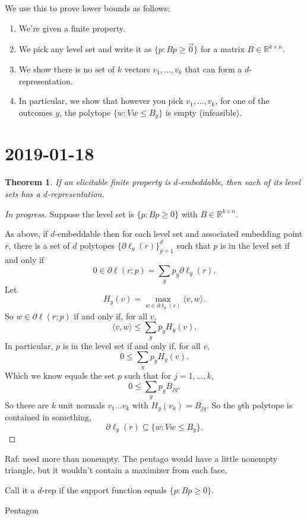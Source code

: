 \documentclass[12pt]{article}
\newtheorem{theorem}{Theorem}
\theoremstyle{definition}
\newcommand{\reals}{\mathbb{R}}
\begin{document}
We use this to prove lower bounds as follows:
\begin{enumerate}
  \item We're given a finite property.
  \item We pick any level set and write it as $\{ p : Bp \geq \vec{0}\}$ for a matrix $B \in \reals^{k \times n}$.
  \item We show there is no set of $k$ vectors $v_1,\dots,v_k$ that can form a $d$-representation.
  \item In particular, we show that however you pick $v_1,\dots,v_k$, for one of the outcomes $y$, the polytope $\{w : Vw \leq B_y \}$ is empty (infeasible).
\end{enumerate}


\break

\section{2019-01-18}

\begin{theorem}
  If an elicitable finite property is $d$-embeddable, then each of its level sets has a $d$-representation.
\end{theorem}
\begin{proof}
  [In progress]
  Suppose the level set is $\{p : Bp \geq 0\}$ with $B \in \reals^{k \times n}$.
  
  As above, if $d$-embeddable then for each level set and associated embedding point $r$, there is a set of $d$ polytopes $\{\partial \ell_y(r)\}_{y=1}^d$ such that $p$ is in the level set if and only if
  \[ 0 \in \partial \ell(r;p) = \sum_y p_y \partial \ell_y(r) . \]
  Let
    \[ H_y(v) = \max_{w \in \partial \ell_y(r)} \langle v , w \rangle . \]
  So $w \in \partial \ell(r;p)$ if and only if, for all $v$,
    \[ \langle v, w\rangle \leq \sum_y p_y H_y(v) . \]
  In particular, $p$ is in the level set if and only if, for all $v$,
    \[ 0 \leq \sum_y p_y H_y(v) . \]
  Which we know equals the set $p$ such that for $j=1,\dots,k$,
    \[ 0 \leq \sum_y p_y B_{jy} . \]
  So there are $k$ unit normals $v_1 \dots v_k$ with $H_y(v_k) = B_{jy}$.
  So the $y$th polytope is contained in something,
    \[ \partial \ell_y(r) \subseteq \{ w : Vw \leq B_y \} . \]
\end{proof}
  

Raf: need more than nonempty. The pentago would have a little nonempty triangle, but it wouldn't contain a maximizer from each face.

Call it a $d$-rep if the support function equals $\{p : Bp \geq 0\}$.

Pentagon
\end{document}
